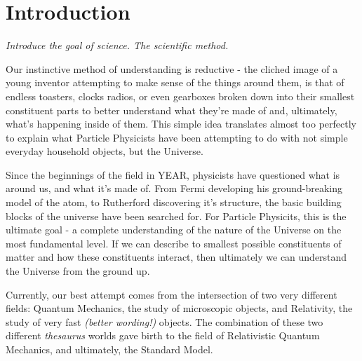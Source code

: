 
\chapter{Introduction}  %

\ifpdf
    \graphicspath{{Chapter1/Figs/Raster/}{Chapter1/Figs/PDF/}{Chapter1/Figs/}}
\else
    \graphicspath{{Chapter1/Figs/Vector/}{Chapter1/Figs/}}
\fi


\label{sec:introduction_intro}

\emph{Introduce the goal of science. The scientific method.}

Our instinctive method of understanding is reductive - the cliched image of a
young inventor attempting to make sense of the things around them, is
that of endless toasters, clocks radios, or even gearboxes broken down into
their smallest constituent parts to better understand what they're made of and,
ultimately, what's happening inside of them. This simple idea translates almost
too perfectly to explain what Particle Physicists have been attempting to do
with not simple everyday household objects, but the Universe.

Since the beginnings of the field in YEAR, physicists have questioned
what is
around us, and what it's made of. From Fermi developing his ground-breaking
model of the atom, to Rutherford discovering it's structure, the basic building
blocks of the universe have been searched for. For Particle Physicits, this is
the ultimate goal - a complete understanding of the nature of the Universe on
the most
fundamental level. If we can describe to smallest possible constituents of
matter and how these constituents interact, then ultimately we can understand
the Universe from the ground up.

Currently, our best attempt comes from the intersection of two very different
fields: Quantum Mechanics, the study of microscopic objects, and Relativity, the
study of very fast \emph{(better wording!)} objects. The combination of these
two different \emph{thesaurus} worlds gave birth to the field of Relativistic
Quantum Mechanics, and ultimately, the Standard Model.

